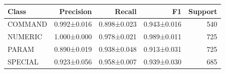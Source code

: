 \begin{tabular}{lrrrr}
\toprule
Class & Precision & Recall & F1 & Support \\
\midrule
COMMAND & 0.992±0.016 & 0.898±0.023 & 0.943±0.016 & 540 \\
NUMERIC & 1.000±0.000 & 0.978±0.021 & 0.989±0.011 & 725 \\
PARAM & 0.890±0.019 & 0.938±0.048 & 0.913±0.031 & 725 \\
SPECIAL & 0.923±0.056 & 0.958±0.007 & 0.939±0.030 & 685 \\
\bottomrule
\end{tabular}
